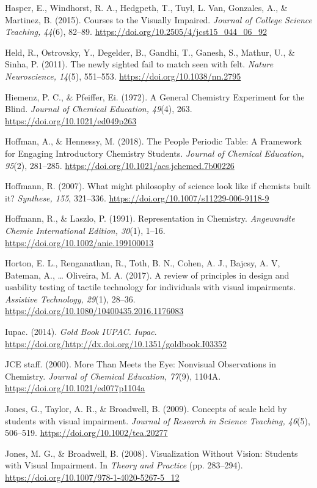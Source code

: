 \documentclass[11.5pt]{sig-alternate} %
\begin{document}
Hasper, E., Windhorst, R. A., Hedgpeth, T., Tuyl, L. Van, Gonzales, A., \& Martinez, B. (2015). Courses to the Visually Impaired. \textit{Journal of College Science Teaching, 44}(6), 82–89. \url{https://doi.org/10.2505/4/jcst15\_044\_06\_92}

Held, R., Ostrovsky, Y., Degelder, B., Gandhi, T., Ganesh, S., Mathur, U., \& Sinha, P. (2011). The newly sighted fail to match seen with felt. \textit{Nature Neuroscience, 14}(5), 551–553. \url{https://doi.org/10.1038/nn.2795}

Hiemenz, P. C., \& Pfeiffer, Ei. (1972). A General Chemistry Experiment for the Blind. \textit{Journal of Chemical Education, 49}(4), 263. \url{https://doi.org/10.1021/ed049p263}

Hoffman, A., \& Hennessy, M. (2018). The People Periodic Table: A Framework for Engaging Introductory Chemistry Students. \textit{Journal of Chemical Education, 95}(2), 281–285. \url{https://doi.org/10.1021/acs.jchemed.7b00226}

Hoffmann, R. (2007). What might philosophy of science look like if chemists built it? \textit{Synthese, 155}, 321–336. \url{https://doi.org/10.1007/s11229-006-9118-9}

Hoffmann, R., \& Laszlo, P. (1991). Representation in Chemistry. \textit{Angewandte Chemie International Edition, 30}(1), 1–16. \url{https://doi.org/10.1002/anie.199100013}

Horton, E. L., Renganathan, R., Toth, B. N., Cohen, A. J., Bajcsy, A. V, Bateman, A., … Oliveira, M. A. (2017). A review of principles in design and usability testing of tactile technology for individuals with visual impairments. \textit{Assistive Technology, 29}(1), 28–36. \url{https://doi.org/10.1080/10400435.2016.1176083}

Iupac. (2014). \textit{Gold Book IUPAC. Iupac}. \url{https://doi.org/http://dx.doi.org/10.1351/goldbook.I03352}

JCE staff. (2000). More Than Meets the Eye: Nonvisual Observations in Chemistry. \textit{Journal of Chemical Education, 77}(9), 1104A. \url{https://doi.org/10.1021/ed077p1104a}

Jones, G., Taylor, A. R., \& Broadwell, B. (2009). Concepts of scale held by students with visual impairment. \textit{Journal of Research in Science Teaching, 46}(5), 506–519. \url{https://doi.org/10.1002/tea.20277}

Jones, M. G., \& Broadwell, B. (2008). Visualization Without Vision: Students with Visual Impairment. In \textit{Theory and Practice} (pp. 283–294). \url{https://doi.org/10.1007/978-1-4020-5267-5\_12}
\end{document}
